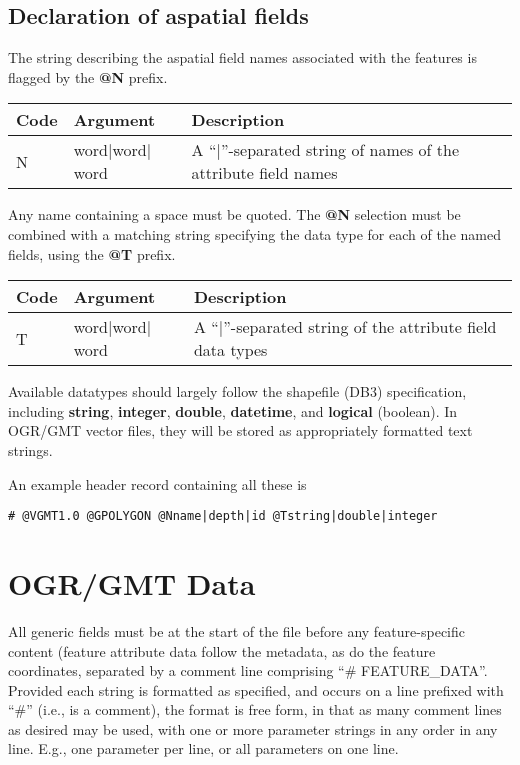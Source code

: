 \subsection{Declaration of aspatial fields}

The string describing the aspatial field names associated with the features is
flagged by the \textbf{@N} prefix.

\begin{table}[H]
\small
\centering
\begin{tabular}{lll} \hline
\textbf{Code}	&	\textbf{Argument}	&	\textbf{Description} \\ \hline \hline
N	&	word$|$word$|$word	&	A ``$|$''-separated string of names of the attribute field names \\ \hline
\end{tabular}
\label{tbl:Q3}
\end{table} 
\noindent
Any name containing a space must be quoted.   The \textbf{@N} selection must be combined with a matching string specifying the data type
for each of the named fields, using the \textbf{@T} prefix.
\begin{table}[H]
\small
\centering
\begin{tabular}{lll} \hline
\textbf{Code}	&	\textbf{Argument}	&	\textbf{Description} \\ \hline \hline
T	&	word$|$word$|$word	&		A ``$|$''-separated string of the attribute field data types \\ \hline
\end{tabular}
\label{tbl:Q4}
\end{table} 
\noindent
Available datatypes should largely follow the shapefile (DB3)
specification, including \textbf{string}, \textbf{integer}, \textbf{double},
\textbf{datetime}, and \textbf{logical} (boolean).
In OGR/GMT vector files, they will be stored as appropriately formatted text strings. 

An example header record containing all these is
\begin{verbatim}
# @VGMT1.0 @GPOLYGON @Nname|depth|id @Tstring|double|integer
\end{verbatim}

\section{OGR/GMT Data}

All generic fields must be at the start of the file before
any feature-specific content (feature attribute data follow the
metadata, as do the feature coordinates, separated by a comment line
comprising ``\# FEATURE\_DATA''.
Provided each string is formatted as specified, and occurs on a line
prefixed with ``\#'' (i.e., is a
comment), the format is free form, in that as many comment lines as
desired may be used, with one or more parameter strings in any order in
any line. E.g., one parameter per line, or all parameters on one line.

